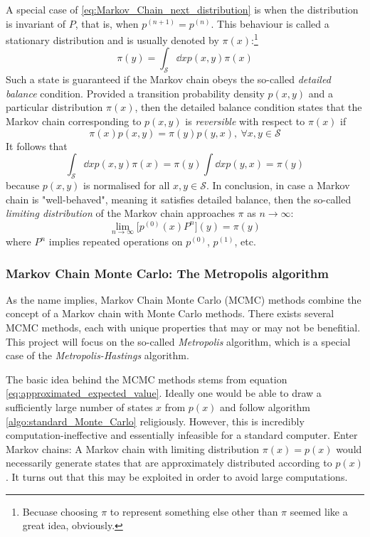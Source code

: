 \documentclass[nofootinbib,reprint,english]{revtex4-1}
\newcommand{\Sspace}{\mathcal{S}}
\begin{document}
A special case of \eqref{eq:Markov_Chain_next_distribution} is when the distribution is invariant of \(P\), that is, when \(p^{(n+1)}=p^{(n)}\). This behaviour is called a stationary distribution and is usually denoted by \(\pi(x)\):\footnote{Becuase choosing \(\pi\) to represent something else other than \(\pi\) seemed like a great idea, obviously.}
\begin{equation}
\pi(y)=\int_\Sspace\dd{x}p(x,y)\pi(x)
\end{equation}
Such a state is guaranteed if the Markov chain obeys the so-called \emph{detailed balance} condition. Provided a transition probability density \(p(x,y)\) and a particular distribution \(\pi(x)\), then the detailed balance condition states that the Markov chain corresponding to \(p(x,y)\) is \emph{reversible} with respect to \(\pi(x)\) if
\begin{equation}\label{eq:Markov_Chain_detailed_balance}
\pi(x)p(x,y)=\pi(y)p(y,x),\ \forall x,y\in\Sspace
\end{equation}
It follows that
\[\int_\Sspace\dd{x}p(x,y)\pi(x)=\pi(y)\int\dd{x}p(y,x)=\pi(y)\]
because \(p(x,y)\) is normalised for all \(x,y\in\Sspace\). In conclusion, in case a Markov chain is "well-behaved", meaning it satisfies detailed balance, then the so-called \emph{limiting distribution} of the Markov chain approaches \(\pi\) as \(n\to\infty\):
\begin{equation}
\lim_{n\to\infty}\big[p^{(0)}(x)P^n\big](y)=\pi(y)
\end{equation}
where \(P^n\) implies repeated operations on \(p^{(0)}\), \(p^{(1)}\), etc.
\subsubsection{Markov Chain Monte Carlo: The Metropolis algorithm}
As the name implies, Markov Chain Monte Carlo (MCMC) methods combine the concept of a Markov chain with Monte Carlo methods. There exists several MCMC methods, each with unique properties that may or may not be benefitial. This project will focus on the so-called \emph{Metropolis} algorithm, which is a special case of the \emph{Metropolis-Hastings} algorithm.

The basic idea behind the MCMC methods stems from equation \eqref{eq:approximated_expected_value}. Ideally one would be able to draw a sufficiently large number of states \(x\) from \(p(x)\) and follow algorithm \ref{algo:standard_Monte_Carlo} religiously. However, this is incredibly computation-ineffective and essentially infeasible for a standard computer. Enter Markov chains: A Markov chain with limiting distribution \(\pi(x)=p(x)\) would necessarily generate states that are approximately distributed according to \(p(x)\). It turns out that this may be exploited in order to avoid large computations.
\end{document}
